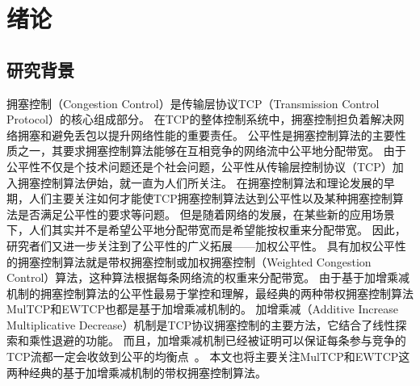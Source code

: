 \documentclass[winfonts]{njuthesis}
\begin{document}
\tableofcontents



\mainmatter

\chapter{绪论}\label{chapter:introduction}
\section{研究背景}
拥塞控制（Congestion Control）是传输层协议TCP（Transmission Control Protocol）的核心组成部分。
在TCP的整体控制系统中，拥塞控制担负着解决网络拥塞和避免丢包以提升网络性能的重要责任\cite{jacobson1988congestion}。
公平性是拥塞控制算法的主要性质之一，其要求拥塞控制算法能够在互相竞争的网络流中公平地分配带宽。
由于公平性不仅是个技术问题还是个社会问题，公平性从传输层控制协议（TCP）加入拥塞控制算法伊始，就一直为人们所关注。
在拥塞控制算法和理论发展的早期，人们主要关注如何才能使TCP拥塞控制算法达到公平性以及某种拥塞控制算法是否满足公平性的要求等问题\cite{chiu1989analysis}\cite{kelly1998rate}\cite{hasegawa1999fairness}。
但是随着网络的发展，在某些新的应用场景\cite{wischik2011design}\cite{Nathan2019wcubic}下，人们其实并不是希望公平地分配带宽而是希望能按权重来分配带宽。
因此，研究者们又进一步关注到了公平性的广义拓展——加权公平性。
具有加权公平性的拥塞控制算法就是带权拥塞控制或加权拥塞控制（Weighted Congestion Control）算法，这种算法根据每条网络流的权重来分配带宽。
由于基于加增乘减机制的拥塞控制算法的公平性最易于掌控和理解，最经典的两种带权拥塞控制算法MulTCP\cite{crowcroft1998differentiated}和EWTCP\cite{wischik2011design}也都是基于加增乘减机制的。
加增乘减（Additive Increase Multiplicative Decrease）机制是TCP协议拥塞控制的主要方法，它结合了线性探索和乘性退避的功能。
而且，加增乘减机制已经被证明可以保证每条参与竞争的TCP流都一定会收敛到公平的均衡点~\cite{chiu1989analysis}。
本文也将主要关注MulTCP和EWTCP这两种经典的基于加增乘减机制的带权拥塞控制算法。
\end{document}
